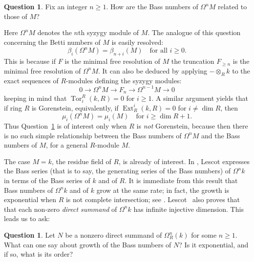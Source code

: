 \documentclass{amsart}
\numberwithin{equation}{section}
\theoremstyle{plain}
\theoremstyle{definition}
\newtheorem{question}[equation]{Question}
\theoremstyle{remark}
\newcommand{\ext}{\operatorname{Ext}}
\newcommand{\tor}{\operatorname{Tor}}
\begin{document}
\begin{question}
\label{qu:bass-M}
Fix an integer $n\ge 1$.  How are the Bass numbers of $\Omega^nM$ related to those of $M$?
\end{question}
Here $\Omega^nM$ denotes the $n$th syzygy module of $M$. The analogue of this question concerning the Betti numbers of $M$ is easily resolved:
\[
\beta_i(\Omega^nM) = \beta_{n+i}(M) \quad\text{for all $i\ge 0$.}
\]
This is because if $F$ is the minimal free resolution of $M$ the truncation $F_{\geqslant n}$ is the minimal free resolution of $\Omega^nM$. It can also be deduced by applying $-\otimes_R k$ to the exact sequences of $R$-modules defining the syzygy modules:
\[
0\longrightarrow \Omega^{n}M \longrightarrow F_n \longrightarrow \Omega^{n-1}M\longrightarrow 0
\]
keeping in mind that $\tor^R_i(k,R)=0$ for $i\ge 1$. A similar argument yields that if ring $R$ is Gorenstein, equivalently, if $\ext^i_R(k,R)=0$ for $i\ne \dim R$,  then
\[
\mu_i(\Omega^nM) = \mu_i(M)\quad\text{for $i\ge \dim R+1$.}
\]
Thus Question~\ref{qu:bass-M} is of interest only when $R$ is \emph{not} Gorenstein, because  then there is no such simple relationship between the Bass numbers of $\Omega^nM$ and the Bass numbers of $M$, for a general $R$-module $M$.

The case $M=k$, the residue field of $R$, is already of interest.  In \cite{Lescot:1986}, Lescot expresses the Bass series (that is to say, the generating series of the Bass numbers) of $\Omega^nk$ in terms of the Bass series of $k$ and of $R$.  It is immediate from this result that Bass numbers of $\Omega^nk$ and of $k$ grow at the same rate; in fact, the growth is exponential when $R$ is not complete intersection; see \cite{Avramov:1998a}. Lescot~\cite{Lescot:1986} also proves that
that each non-zero \emph{direct summand} of $\Omega^nk$ has infinite injective dimension. This leads us to ask:

\begin{question}
\label{qu:bass}
Let $N$ be a nonzero direct summand of $\Omega^n_R(k)$ for some $n\ge 1$. What can one say about growth of the Bass numbers of $N$? Is it exponential, and if so, what is its order?
\end{question}
\end{document}
